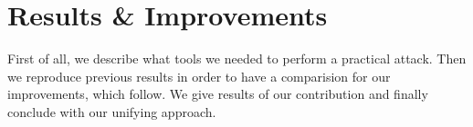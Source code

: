 \chapter{Results \& Improvements}
\label{chap:results}

First of all, we describe what tools we needed to perform a practical attack. Then we reproduce previous results in order to have a comparision for our improvements, which follow. We give results of our contribution and finally conclude with our unifying approach.







